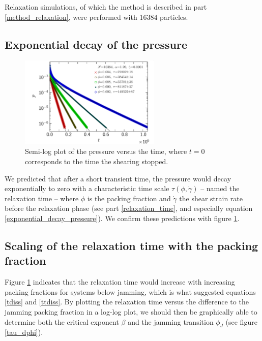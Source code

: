 \documentclass[class=report, float=false, crop=false]{standalone}
\begin{document}
Relaxation simulations, of which the method is described in part \ref{method_relaxation}, were performed with 16384 particles.

\subsection{Exponential decay of the pressure}

\begin{figure}[h!]
\centering
\includegraphics[width=0.6\textwidth]{figures/figs/pe_t_16384_EL120_GDh100}
\caption{Semi-log plot of the pressure versus the time, where $t=0$ corresponds to the time the shearing stopped.}
\label{pe_t_16384_EL120_GDh100}
\end{figure}

We predicted that after a short transient time, the pressure would decay exponentially to zero with a characteristic time scale $\tau(\phi,\dot{\gamma})$ -- named the relaxation time -- where $\phi$ is the packing fraction and $\dot{\gamma}$ the shear strain rate before the relaxation phase (see part \ref{relaxation_time}, and especially equation \ref{exponential_decay_pressure}). We confirm these predictions with figure \ref{pe_t_16384_EL120_GDh100}.

\subsection{Scaling of the relaxation time with the packing fraction}

Figure \ref{pe_t_16384_EL120_GDh100} indicates that the relaxation time would increase with increasing packing fractions for systems below jamming, which is what suggested equations \ref{tdiss} and \ref{ttdiss}. By plotting the relaxation time versus the difference to the jamming packing fraction in a log-log plot, we should then be graphically able to determine both the critical exponent $\beta$ and the jamming transition $\phi_J$ (see figure \ref{tau_dphi}).
\end{document}

